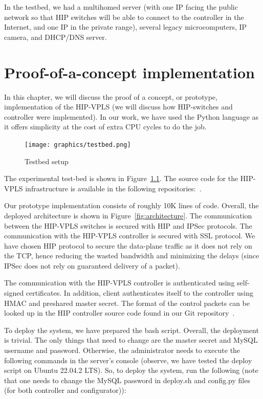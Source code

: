In the testbed, we had a multihomed server (with one IP facing 
the public network so that HIP switches will be able to connect to 
the controller in the Internet, and one IP in the private range), 
several legacy microcomputers, IP camera, and DHCP/DNS server.


\chapter{Proof-of-a-concept implementation}
In this chapter, we will discuss the proof of a concept, or 
prototype, implementation of the HIP-VPLS (we will discuss 
how HIP-switches and controller were implemented). In our work, 
we have used the Python language as it offers simplicity at the 
cost of extra CPU cycles to do the job.

\begin{figure}[ht!]
\centering
\texttt{[image: graphics/testbed.png]}
\caption{Testbed setup}
\label{fig:testbed}
\end{figure}    

The experimental test-bed is shown in Figure~\ref{fig:testbed}. 
The source code for the HIP-VPLS infrastructure is available in 
the following repositories:~\cite{controllerimpl, hipswitchimp}.

Our prototype implementation consists of roughly 10K 
lines of code. Overall, the deployed architecture is 
shown in Figure~\ref{fig:architecture}. The communication 
between the HIP-VPLS switches is secured with HIP and IPSec 
protocols. The communication with the HIP-VPLS controller is 
secured with SSL protocol. We have chosen HIP protocol to 
secure the data-plane traffic as it does not rely on the 
TCP, hence reducing the wasted bandwidth and minimizing the 
delays (since IPSec does not rely on guaranteed delivery of a packet). 

The communication with the HIP-VPLS controller is authenticated 
using self-signed certificates. In addition, client authenticates 
itself to the controller using HMAC and preshared master secret. 
The format of the control packets can be looked up in the HIP 
controller source code found in our Git 
repository~\cite{controllerimpl}. 

To deploy the system, we have prepared the bash script. 
Overall, the deployment is trivial. The only things that 
need to change are the master secret and MySQL username 
and password. Otherwise, the administrator needs to execute 
the following commands in the server's console (observe, 
we have tested the deploy script on Ubuntu 22.04.2 LTS). 
So, to deploy the system, run the following (note that one 
needs to change the MySQL password in deploy.sh and config.py 
files (for both controller and configurator)):

